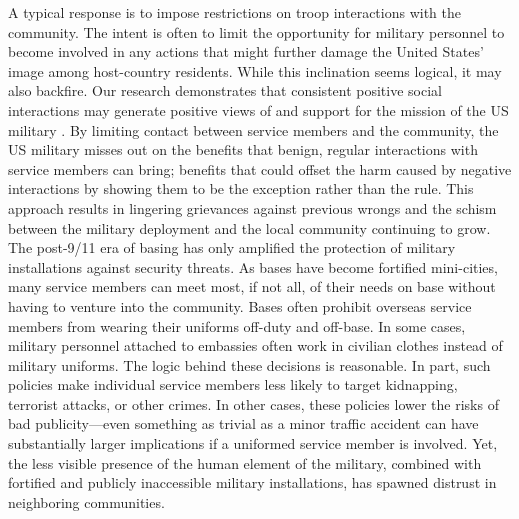 A typical response is to impose restrictions on troop interactions with the community. The intent is often to limit the opportunity for military personnel to become involved in any actions that might further damage the United States' image among host-country residents. While this inclination seems logical, it may also backfire. Our research demonstrates that consistent positive social interactions may generate positive views of and support for the mission of the US military \cite{Allen2020}. By limiting contact between service members and the community, the US military misses out on the benefits that benign, regular interactions with service members can bring; benefits that could offset the harm caused by negative interactions by showing them to be the exception rather than the rule. This approach results in lingering grievances against previous wrongs and the schism between the military deployment and the local community continuing to grow.  
The post-9/11 era of basing has only amplified the protection of military installations against security threats. As bases have become fortified mini-cities, many service members can meet most, if not all, of their needs on base without having to venture into the community. Bases often prohibit overseas service members from wearing their uniforms off-duty and off-base. In some cases, military personnel attached to embassies often work in civilian clothes instead of military uniforms. The logic behind these decisions is reasonable. In part, such policies make individual service members less likely to target kidnapping, terrorist attacks, or other crimes. In other cases, these policies lower the risks of bad publicity---even something as trivial as a minor traffic accident can have substantially larger implications if a uniformed service member is involved.  Yet, the less visible presence of the human element of the military, combined with fortified and publicly inaccessible military installations, has spawned distrust in neighboring communities. 

